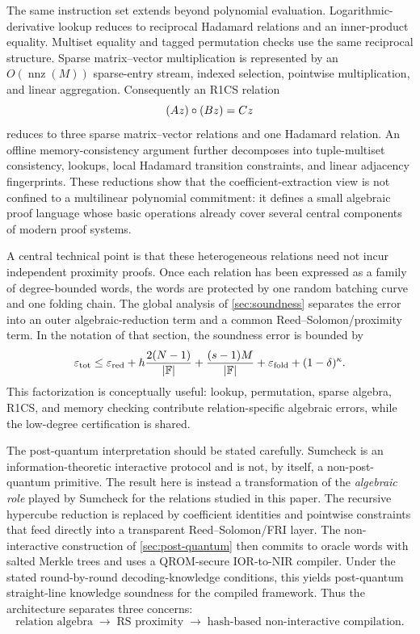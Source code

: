 The same instruction set extends beyond polynomial evaluation.  Logarithmic-derivative lookup reduces to reciprocal Hadamard relations and an inner-product equality.  Multiset equality and tagged permutation checks use the same reciprocal structure.  Sparse matrix--vector multiplication is represented by an $O(\operatorname{nnz}(M))$ sparse-entry stream, indexed selection, pointwise multiplication, and linear aggregation.  Consequently an R1CS relation
\[
  (Az)\circ(Bz)=Cz
\]
reduces to three sparse matrix--vector relations and one Hadamard relation.  An offline memory-consistency argument further decomposes into tuple-multiset consistency, lookups, local Hadamard transition constraints, and linear adjacency fingerprints.  These reductions show that the coefficient-extraction view is not confined to a multilinear polynomial commitment: it defines a small algebraic proof language whose basic operations already cover several central components of modern proof systems.

A central technical point is that these heterogeneous relations need not incur independent proximity proofs.  Once each relation has been expressed as a family of degree-bounded words, the words are protected by one random batching curve and one folding chain.  The global analysis of \cref{sec:soundness} separates the error into an outer algebraic-reduction term and a common Reed--Solomon/proximity term.  In the notation of that section, the soundness error is bounded by
\[
  \varepsilon_{\mathrm{tot}}
  \le
  \varepsilon_{\mathrm{red}}
  +h\frac{2(N-1)}{|\mathbb{F}|}
  +\frac{(s-1)M}{|\mathbb{F}|}
  +\varepsilon_{\mathrm{fold}}
  +(1-\delta)^\kappa.
\]
This factorization is conceptually useful: lookup, permutation, sparse algebra, R1CS, and memory checking contribute relation-specific algebraic errors, while the low-degree certification is shared.

The post-quantum interpretation should be stated carefully.  Sumcheck is an information-theoretic interactive protocol and is not, by itself, a non-post-quantum primitive.  The result here is instead a transformation of the \emph{algebraic role} played by Sumcheck for the relations studied in this paper.  The recursive hypercube reduction is replaced by coefficient identities and pointwise constraints that feed directly into a transparent Reed--Solomon/FRI layer.  The non-interactive construction of \cref{sec:post-quantum} then commits to oracle words with salted Merkle trees and uses a QROM-secure IOR-to-NIR compiler.  Under the stated round-by-round decoding-knowledge conditions, this yields post-quantum straight-line knowledge soundness for the compiled framework.  Thus the architecture separates three concerns:
\[
  \boxed{
  \text{relation algebra}
  \;\longrightarrow\;
  \text{RS proximity}
  \;\longrightarrow\;
  \text{hash-based non-interactive compilation}.}
\]

